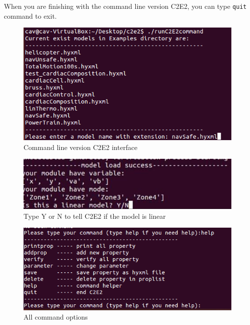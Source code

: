 \documentclass{tufte-book} %
\begin{document}
When you are finishing with the command line version C2E2, you can type \texttt{quit} command to exit.

\begin{figure}
 \centerline{\includegraphics[scale=.25,keepaspectratio=true]{Images/terminal_main.png}}
 \caption{Command line version C2E2 interface} 
  \label{figure:terminalmain}
\end{figure}

\begin{figure}
 \centerline{\includegraphics[scale=.25,keepaspectratio=true]{Images/terminal_linear.png}}
 \caption{Type Y or N to tell C2E2 if the model is linear} 
  \label{figure:terminallinear}
\end{figure}

\begin{figure}
 \centerline{\includegraphics[scale=.25,keepaspectratio=true]{Images/terminal_help.png}}
 \caption{All command options} 
  \label{figure:terminalhelp}
\end{figure}
\end{document}
